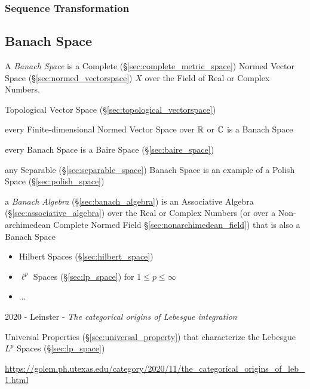 \subsubsection{Sequence Transformation}\label{sec:sequence_transformation}



\subsection{Banach Space}\label{sec:banach_space}

A \emph{Banach Space} is a Complete (\S\ref{sec:complete_metric_space}) Normed
Vector Space (\S\ref{sec:normed_vectorspace}) $X$ over the Field of Real or
Complex Numbers.

Topological Vector Space (\S\ref{sec:topological_vectorspace})

every Finite-dimensional Normed Vector Space over $\mathbb{R}$ or $\mathbb{C}$ is a
Banach Space

every Banach Space is a Baire Space (\S\ref{sec:baire_space})

any Separable (\S\ref{sec:separable_space}) Banach Space is an example of a
Polish Space (\S\ref{sec:polish_space})

a \emph{Banach Algebra} (\S\ref{sec:banach_algebra}) is an Associative Algebra
(\S\ref{sec:associative_algebra}) over the Real or Complex Numbers (or over a
Non-archimedean Complete Normed Field \S\ref{sec:nonarchimedean_field}) that is
also a Banach Space

\begin{itemize}
  \item Hilbert Spaces (\S\ref{sec:hilbert_space})
  \item $\ell^p$ Spaces (\S\ref{sec:lp_space}) for $1 \leq p \leq \infty$
  \item ...
\end{itemize}

\asterism

2020 - Leinster - \emph{The categorical origins of Lebesgue integration}

Universal Properties (\S\ref{sec:universal_property}) that characterize the
Lebesgue $L^p$ Spaces (\S\ref{sec:lp_space})

\url{https://golem.ph.utexas.edu/category/2020/11/the_categorical_origins_of_leb_1.html}

